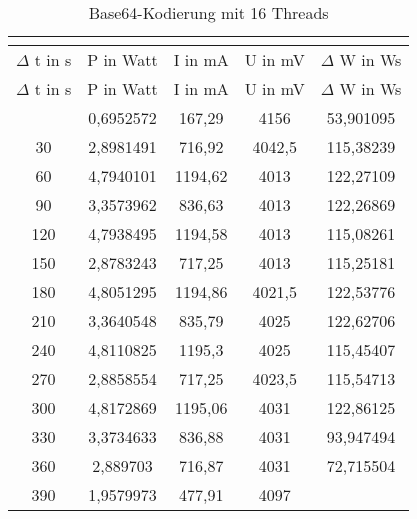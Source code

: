 
\begin{longtable}[c]{ccccc}
\caption{Base64-Kodierung mit 16 Threads} \\
\label{tab:Base64MessungThreadSechszehn}\\
\hline
{$\Delta$ t in s} & {P in Watt} & {I in mA} & {U in mV} & {$\Delta$ W in Ws} \\
\hline
\endfirsthead
\hline
$\Delta$ t in s & P in Watt & I in mA & U in mV & $\Delta$ W in Ws \\
\hline
\endhead
\hline
\endfoot
\hline
           \midrule
    0     & 0,6952572 & 167,29 & 4156  & 53,901095 \\
    \midrule
    30    & 2,8981491 & 716,92 & 4042,5 & 115,38239 \\
    \midrule
    60    & 4,7940101 & 1194,62 & 4013  & 122,27109 \\
    \midrule
    90    & 3,3573962 & 836,63 & 4013  & 122,26869 \\
    \midrule
    120   & 4,7938495 & 1194,58 & 4013  & 115,08261 \\
    \midrule
    150   & 2,8783243 & 717,25 & 4013  & 115,25181 \\
    \midrule
    180   & 4,8051295 & 1194,86 & 4021,5 & 122,53776 \\
    \midrule
    210   & 3,3640548 & 835,79 & 4025  & 122,62706 \\
    \midrule
    240   & 4,8110825 & 1195,3 & 4025  & 115,45407 \\
    \midrule
    270   & 2,8858554 & 717,25 & 4023,5 & 115,54713 \\
    \midrule
    300   & 4,8172869 & 1195,06 & 4031  & 122,86125 \\
    \midrule
    330   & 3,3734633 & 836,88 & 4031  & 93,947494 \\
    \midrule
    360   & 2,889703 & 716,87 & 4031  & 72,715504 \\
    \midrule
    390   & 1,9579973 & 477,91 & 4097  &  \\
\end{longtable}
